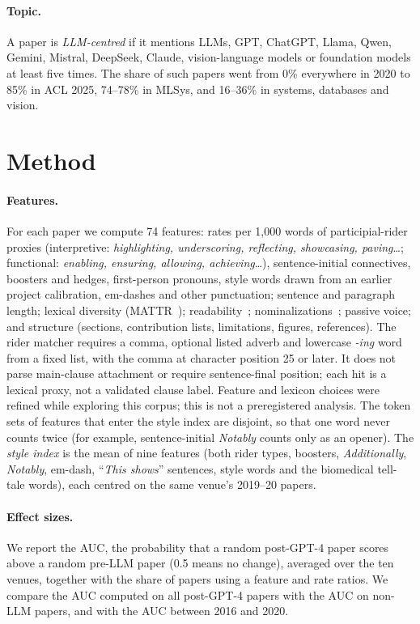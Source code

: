 \documentclass[10pt,twocolumn]{article}
\begin{document}
\paragraph{Topic.} A paper is \emph{LLM-centred} if it mentions LLMs, GPT, ChatGPT, Llama, Qwen, Gemini, Mistral, DeepSeek, Claude, vision-language models or foundation models at least five times. The share of such papers went from 0\% everywhere in 2020 to 85\% in ACL 2025, 74--78\% in MLSys, and 16--36\% in systems, databases and vision.

\section{Method}

\paragraph{Features.} For each paper we compute 74 features: rates per 1,000 words of participial-rider proxies (interpretive: \textit{highlighting, underscoring, reflecting, showcasing, paving}\ldots; functional: \textit{enabling, ensuring, allowing, achieving}\ldots), sentence-initial connectives, boosters and hedges, first-person pronouns, style words drawn from an earlier project calibration, em-dashes and other punctuation; sentence and paragraph length; lexical diversity (MATTR~\citep{covington2010mattr}); readability~\citep{flesch1948}; nominalizations~\citep{biber2010academic}; passive voice; and structure (sections, contribution lists, limitations, figures, references). The rider matcher requires a comma, optional listed adverb and lowercase \textit{-ing} word from a fixed list, with the comma at character position 25 or later. It does not parse main-clause attachment or require sentence-final position; each hit is a lexical proxy, not a validated clause label. Feature and lexicon choices were refined while exploring this corpus; this is not a preregistered analysis. The token sets of features that enter the style index are disjoint, so that one word never counts twice (for example, sentence-initial \textit{Notably} counts only as an opener). The \emph{style index} is the mean of nine features (both rider types, boosters, \textit{Additionally}, \textit{Notably}, em-dash, ``\textit{This shows}'' sentences, style words and the biomedical tell-tale words), each centred on the same venue's 2019--20 papers.

\paragraph{Effect sizes.} We report the AUC, the probability that a random post-GPT-4 paper scores above a random pre-LLM paper (0.5 means no change), averaged over the ten venues, together with the share of papers using a feature and rate ratios. We compare the AUC computed on all post-GPT-4 papers with the AUC on non-LLM papers, and with the AUC between 2016 and 2020.
\end{document}

